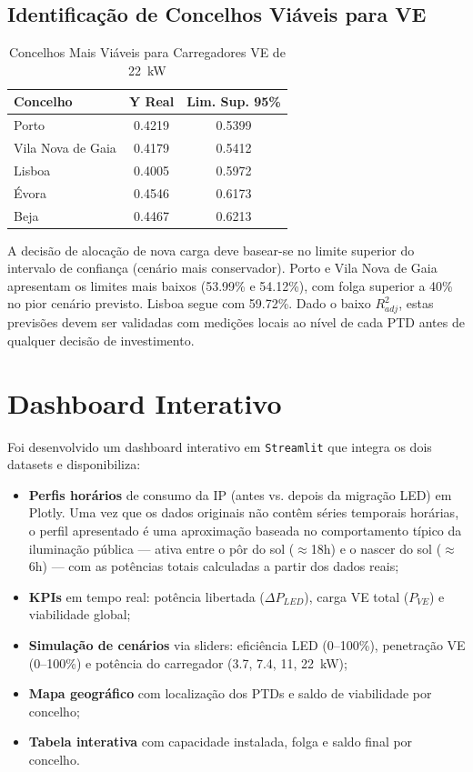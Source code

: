 \documentclass[conference]{IEEEtran}
\begin{document}
\subsection{Identificação de Concelhos Viáveis para VE}

\begin{table}[htbp]
\caption{Concelhos Mais Viáveis para Carregadores VE de 22~kW}
\label{tab:viabilidade}
\centering
\begin{tabular}{lcc}
\hline
\textbf{Concelho}  & \textbf{Y Real} & \textbf{Lim. Sup. 95\%} \\
\hline
Porto              & 0.4219 & 0.5399 \\
Vila Nova de Gaia  & 0.4179 & 0.5412 \\
Lisboa             & 0.4005 & 0.5972 \\
Évora              & 0.4546 & 0.6173 \\
Beja               & 0.4467 & 0.6213 \\
\hline
\end{tabular}
\end{table}

A decisão de alocação de nova carga deve basear-se no limite superior do intervalo de confiança (cenário mais conservador). Porto e Vila Nova de Gaia apresentam os limites mais baixos (53.99\% e 54.12\%), com folga superior a 40\% no pior cenário previsto. Lisboa segue com 59.72\%. Dado o baixo $R^2_{adj}$, estas previsões devem ser validadas com medições locais ao nível de cada PTD antes de qualquer decisão de investimento.

\section{Dashboard Interativo}

Foi desenvolvido um dashboard interativo em \texttt{Streamlit} que integra os dois datasets e disponibiliza:
\begin{itemize}
    \item \textbf{Perfis horários} de consumo da IP (antes vs. depois da migração LED) em Plotly. Uma vez que os dados originais não contêm séries temporais horárias, o perfil apresentado é uma aproximação baseada no comportamento típico da iluminação pública --- ativa entre o pôr do sol ($\approx$18h) e o nascer do sol ($\approx$6h) --- com as potências totais calculadas a partir dos dados reais;
    \item \textbf{KPIs} em tempo real: potência libertada ($\Delta P_{LED}$), carga VE total ($P_{VE}$) e viabilidade global;
    \item \textbf{Simulação de cenários} via sliders: eficiência LED (0--100\%), penetração VE (0--100\%) e potência do carregador (3.7, 7.4, 11, 22~kW);
    \item \textbf{Mapa geográfico} com localização dos PTDs e saldo de viabilidade por concelho;
    \item \textbf{Tabela interativa} com capacidade instalada, folga e saldo final por concelho.
\end{itemize}
\end{document}
